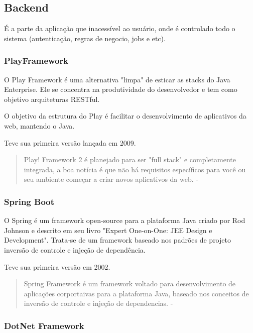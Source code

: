 \subsection{Backend}

É a parte da aplicação que inacessível ao usuário, onde é controlado todo o sistema (autenticação, regras de negocio, jobs e etc).

\subsubsection{PlayFramework}

O Play Framework é uma alternativa "limpa" de esticar as stacks do Java Enterprise. Ele se concentra na produtividade do desenvolvedor e tem como objetivo arquiteturas RESTful. 

O objetivo da estrutura do Play é facilitar o desenvolvimento de aplicativos da web, mantendo o Java.

Teve sua primeira versão lançada em 2009.

\begin{quote}
Play! Framework 2 é planejado para ser "full stack" e completamente integrada, a boa notícia é que não há requisitos específicos para você ou seu ambiente começar a criar novos aplicativos da web. - \cite{petrella2013learning}
\end{quote}

\subsubsection{Spring Boot}

O Spring é um framework open-source para a plataforma Java criado por Rod Johnson e descrito em seu livro "Expert One-on-One: JEE Design e Development".
Trata-se de um framework baseado nos padrões de projeto inversão de controle e injeção de dependência.

Teve sua primeira versão em 2002.

\begin{quote}
  Spring Framework é um framework voltado para desenvolvimento de aplicações corportaivas para a plataforma Java, baseado nos conceitos de inversão de controle e injeção de dependencias. - \cite{weissmann2014vire}
\end{quote}

\subsubsection{DotNet Framework}

